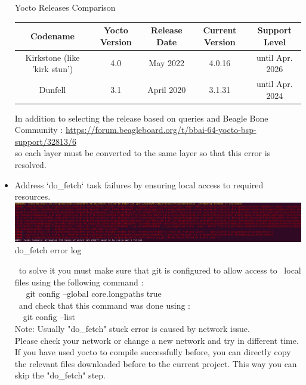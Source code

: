 \begin{itemize}
\centering 
 Yocto Releases Comparison \\

\label{tab:my_label}
\raggedright
\noindent
    \begin{tabular}{|c|c|c|c|c|} \hline 
 Codename& Yocto Version& Release Date& Current Version&Support Level\\ \hline 
         Kirkstone (like 'kirk stun')&  4.0&  May 2022&  4.0.16 & until Apr. 2026\\ \hline 
         Dunfell&  3.1&  April 2020&  3.1.31 & until Apr. 2024\\ \hline
    \end{tabular}
    
    
\raggedright

In addition to selecting the release based on queries and Beagle Bone Community : \url {https://forum.beagleboard.org/t/bbai-64-yocto-bsp-support/32813/6 } \\
so each layer must be converted to the same layer so that this error is resolved.


    \item Address `do\_fetch` task failures by ensuring local access to required resources.\\
       
        \includegraphics[width=1\linewidth]{Images/9_Linux_image/Do Fetch Problem log.png}
 \centering       
do\_fetch error log
        \label{fig:enter-label}
  \\
\raggedright
    \indent 
    ~to solve it you must make sure that git is configured to allow access to \indent ~local files using the following command :\\
    \indent ~ \indent ~git config --global core.longpaths true  \\
    \indent ~and check that this command was done using : \\
   \indent ~\indent~git config --list \\
    Note: Usually "do\_fetch"  stuck error is caused by network issue. \\ Please check your network or change a new network and try in different time. \\
    If you have used yocto to compile successfully before, you can directly copy the relevant files downloaded before to the current project. This way you can skip the "do\_fetch" step. \\

   

\end{itemize}

